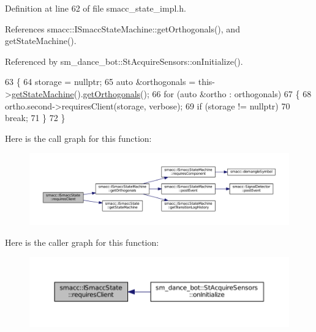 Definition at line 62 of file smacc\+\_\+state\+\_\+impl.\+h.



References smacc\+::\+I\+Smacc\+State\+Machine\+::get\+Orthogonals(), and get\+State\+Machine().



Referenced by sm\+\_\+dance\+\_\+bot\+::\+St\+Acquire\+Sensors\+::on\+Initialize().


\begin{DoxyCode}
63 \{
64     storage = \textcolor{keyword}{nullptr};
65     \textcolor{keyword}{auto} &orthogonals = this->\hyperlink{classsmacc_1_1ISmaccState_a562bb3f9a3ac16b8be71e4794c9e7523}{getStateMachine}().\hyperlink{classsmacc_1_1ISmaccStateMachine_a257783850ae41274f8b7ccbcdafb3f15}{getOrthogonals}();
66     \textcolor{keywordflow}{for} (\textcolor{keyword}{auto} &ortho : orthogonals)
67     \{
68         ortho.second->requiresClient(storage, verbose);
69         \textcolor{keywordflow}{if} (storage != \textcolor{keyword}{nullptr})
70             \textcolor{keywordflow}{break};
71     \}
72 \}
\end{DoxyCode}


Here is the call graph for this function\+:
\nopagebreak
\begin{figure}[H]
\begin{center}
\leavevmode
\includegraphics[width=350pt]{classsmacc_1_1ISmaccState_a0f116de85bbc91d94e1eb2f74502acd8_cgraph}
\end{center}
\end{figure}




Here is the caller graph for this function\+:
\nopagebreak
\begin{figure}[H]
\begin{center}
\leavevmode
\includegraphics[width=350pt]{classsmacc_1_1ISmaccState_a0f116de85bbc91d94e1eb2f74502acd8_icgraph}
\end{center}
\end{figure}


